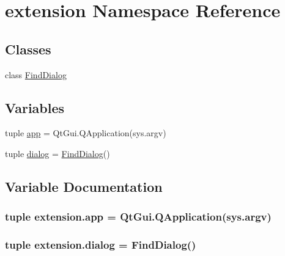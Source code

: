 \hypertarget{namespaceextension}{}\section{extension Namespace Reference}
\label{namespaceextension}
\subsection*{Classes}
\begin{DoxyCompactItemize}
\item 
class \hyperlink{classextension_1_1FindDialog}{Find\+Dialog}
\end{DoxyCompactItemize}
\subsection*{Variables}
\begin{DoxyCompactItemize}
\item 
tuple \hyperlink{namespaceextension_a225854a99e8968fdd47b94f9892311cc}{app} = Qt\+Gui.\+Q\+Application(sys.\+argv)
\item 
tuple \hyperlink{namespaceextension_a54743ff3b8af20ec0de6b8102969b903}{dialog} = \hyperlink{classextension_1_1FindDialog}{Find\+Dialog}()
\end{DoxyCompactItemize}


\subsection{Variable Documentation}
\hypertarget{namespaceextension_a225854a99e8968fdd47b94f9892311cc}{}
\subsubsection[{app}]{\setlength{\rightskip}{0pt plus 5cm}tuple extension.\+app = Qt\+Gui.\+Q\+Application(sys.\+argv)}\label{namespaceextension_a225854a99e8968fdd47b94f9892311cc}
\hypertarget{namespaceextension_a54743ff3b8af20ec0de6b8102969b903}{}
\subsubsection[{dialog}]{\setlength{\rightskip}{0pt plus 5cm}tuple extension.\+dialog = {\bf Find\+Dialog}()}\label{namespaceextension_a54743ff3b8af20ec0de6b8102969b903}
